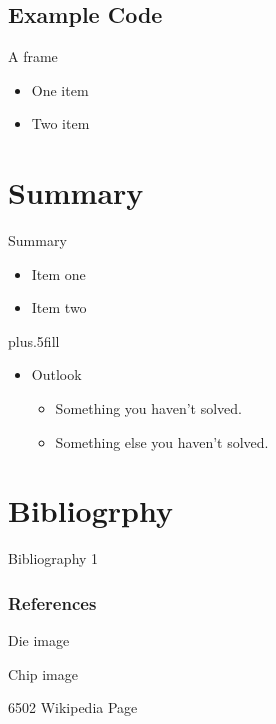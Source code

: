 \documentclass{beamer}
\begin{document}
\subsection[Examples]{Example Code}

\begin{frame}{A frame}
  \begin{itemize}
  \item
    One item
  \item
    Two item
  \end{itemize}
\end{frame}




\section{Summary}

\begin{frame}{Summary}

  \begin{itemize}
  \item
    Item one
  \item
    Item two
  \end{itemize}
  
  \vskip0pt plus.5fill
  \begin{itemize}
  \item
    Outlook
    \begin{itemize}
    \item
      Something you haven't solved.
    \item
      Something else you haven't solved.
    \end{itemize}
  \end{itemize}
\end{frame}

\section{Bibliogrphy}

\begin{frame}{Bibliography 1}
  \frametitle{References}

  \begin{thebibliography}{6502 Wikipedia Page}
    Die image
    
    Chip image

    6502 Wikipedia Page

  \end{thebibliography}
\end{frame}
\end{document}
